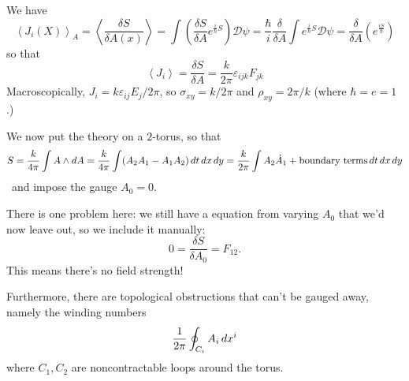 We have
\[
\left \langle J_i(X) \right \rangle_A = \left \langle \frac{\delta S}{\delta A(x)} \right \rangle = \int \left( \frac{\delta S}{\delta A} e^{\frac{i}{\hbar} S}\right) \mathcal D \psi = \frac{\hbar}{i} \frac{\delta}{\delta A} \int e^{\frac{i}{\hbar} S} \mathcal D \psi = \frac{\delta}{\delta A} \left( e^{\frac{iS}{\hbar}} \right)
\]
so that
\[
\left \langle J_i \right \rangle =\frac{\delta S}{\delta A} = \frac{k}{2 \pi} \varepsilon_{ijk} F_{jk}
\]
Macroscopically, $J_i = k \varepsilon_{ij} E_j /2 \pi$, so $\sigma_{xy} = k/2 \pi$ and $\rho_{xy} = 2 \pi /k$ (where $\hbar = e = 1$.)

We now put the theory on a $2$-torus, so that
\[
S = \frac{k}{4 \pi} \int A \wedge dA = \frac{k}{4 \pi} \int (A_2 A_1 - A_1 A_2) \, d t \, d x \, d y = \frac{k}{2 \pi} \int A_2 \dot A_1 + \text{boundary terms} \, d t \, d x \, d y
\]\
and impose the gauge $A_0 = 0$.

There is one problem here: we still have a equation from varying $A_0$ that we'd now leave out, so we include it manually:
\[
0 = \frac{\delta S}{\delta A_0} = F_{12}.
\]
This means there's no field strength!

Furthermore, there are topological obstructions that can't be gauged away, namely the winding numbers
\[
\frac{1}{2 \pi} \oint_{C_i} A_i \, d x^i
\]
where $C_1, C_2$ are noncontractable loops around the torus.